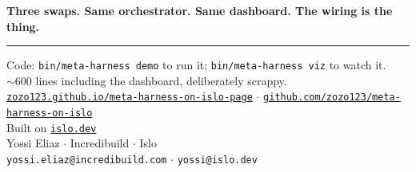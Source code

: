 \documentclass[11pt]{article}
\begin{document}
\textbf{Three swaps. Same orchestrator. Same dashboard. The wiring is the thing.}

\vspace{0.5em}
{\color{border}\hrule}
\vspace{0.6em}

\begin{center}
\small\color{dim}
Code: \texttt{bin/meta-harness demo} to run it; \texttt{bin/meta-harness viz} to watch it.\\
$\sim$600 lines including the dashboard, deliberately scrappy.\\[0.6em]
\href{https://zozo123.github.io/meta-harness-on-islo-page/}{\texttt{zozo123.github.io/meta-harness-on-islo-page}} $\cdot$
\href{https://github.com/zozo123/meta-harness-on-islo}{\texttt{github.com/zozo123/meta-harness-on-islo}}\\[0.3em]
Built on \href{https://islo.dev/}{\texttt{islo.dev}}\\[0.3em]
Yossi Eliaz $\cdot$ Incredibuild $\cdot$ Islo\\[0.1em]
\texttt{yossi.eliaz@incredibuild.com} $\cdot$ \texttt{yossi@islo.dev}
\end{center}
\end{document}
